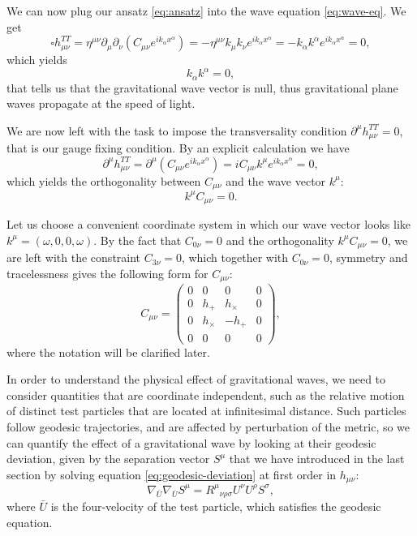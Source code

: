 \documentclass[a4paper]{article}
\begin{document}
We can now plug our ansatz \eqref{eq:ansatz} into the wave equation \eqref{eq:wave-eq}. We get
$$\square h^{TT}_{\mu\nu} = \eta^{\mu\nu}\partial_{\mu}\partial_{\nu}(C_{\mu\nu}e^{ik_{\alpha}x^{\alpha}}) = -\eta^{\mu\nu}k_{\mu}k_{\nu}e^{ik_{\alpha}x^{\alpha}} = -k_{\alpha}k^{\alpha}e^{ik_{\alpha}x^{\alpha}} = 0,$$
which yields
\begin{equation}
  k_{\alpha}k^{\alpha} = 0,
  \label{eq:null-wave-vector}
\end{equation}
that tells us that the gravitational wave vector is null, thus gravitational plane waves propagate at the speed of light.

We are now left with the task to impose the transversality condition $\partial^{\mu}h^{TT}_{\mu\nu} = 0$, that is our gauge fixing condition. By an explicit calculation we have
$$\partial^{\mu}h^{TT}_{\mu\nu} = \partial^{\mu}(C_{\mu\nu}e^{ik_{\alpha}x^{\alpha}}) = iC_{\mu\nu}k^\mu e^{ik_{\alpha}x^{\alpha}} = 0,$$
which yields the orthogonality between $C_{\mu\nu}$ and the wave vector $k^{\mu}$:
\begin{equation}
  k^{\mu}C_{\mu\nu} = 0.
\end{equation}

Let us choose a convenient coordinate system in which our wave vector looks like $k^{\mu} = (\omega,0,0,\omega)$. By the fact that $C_{0\nu} = 0$ and the orthogonality $k^{\mu}C_{\mu\nu} = 0$, we are left with the constraint $C_{3\nu} = 0$, which together with $C_{0\nu} = 0$, symmetry and tracelessness gives the following form for $C_{\mu\nu}$:
\begin{equation}
  C_{\mu\nu} = \begin{pmatrix}
    0 & 0 & 0 & 0\\
    0 & h_{+} & h_{\times} & 0\\
    0 & h_{\times} & -h_{+} & 0\\
    0 & 0 & 0 & 0
  \end{pmatrix},
  \label{eq:cmunu}
\end{equation}
where the notation will be clarified later.

In order to understand the physical effect of gravitational waves, we need to consider quantities that are coordinate independent, such as the relative motion of distinct test particles that are located at infinitesimal distance. Such particles follow geodesic trajectories, and are affected by perturbation of the metric, so we can quantify the effect of a gravitational wave by looking at their geodesic deviation, given by the separation vector $S^{\mu}$ that we have introduced in the last section by solving equation \eqref{eq:geodesic-deviation} at first order in $h_{\mu\nu}$:
\begin{equation}
  \nabla_{\bar{U}}\nabla_{\bar{U}}S^{\mu} = {R^{\mu}}_{\nu\rho\sigma}U^{\nu}U^{\rho}S^{\sigma},
  \label{eq:geo-dev-u}
\end{equation}
where $\bar{U}$ is the four-velocity of the test particle, which satisfies the geodesic equation.
\end{document}
